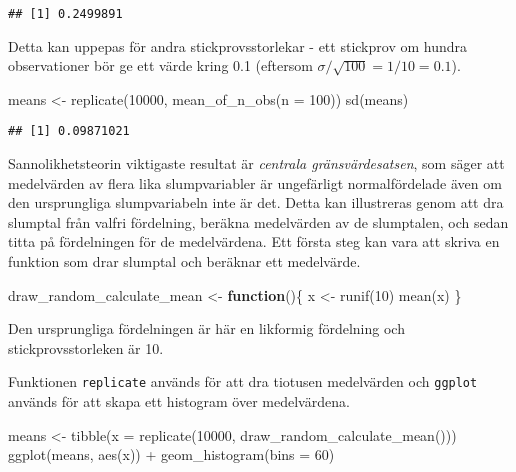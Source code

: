 \documentclass[
]{book}
\newenvironment{Shaded}{\begin{snugshade}}{\end{snugshade}}
\newcommand{\AttributeTok}[1]{\textcolor[rgb]{0.77,0.63,0.00}{#1}}
\newcommand{\ControlFlowTok}[1]{\textcolor[rgb]{0.13,0.29,0.53}{\textbf{#1}}}
\newcommand{\DecValTok}[1]{\textcolor[rgb]{0.00,0.00,0.81}{#1}}
\newcommand{\FunctionTok}[1]{\textcolor[rgb]{0.00,0.00,0.00}{#1}}
\newcommand{\NormalTok}[1]{#1}
\newcommand{\OtherTok}[1]{\textcolor[rgb]{0.56,0.35,0.01}{#1}}
\newcommand{\SpecialCharTok}[1]{\textcolor[rgb]{0.00,0.00,0.00}{#1}}
\theoremstyle{definition}
\theoremstyle{definition}
\theoremstyle{definition}
\theoremstyle{definition}
\theoremstyle{remark}
\begin{document}
\begin{verbatim}
## [1] 0.2499891
\end{verbatim}

Detta kan uppepas för andra stickprovsstorlekar - ett stickprov om hundra observationer bör ge ett värde kring 0.1 (eftersom \(\sigma / \sqrt{100} = 1 / 10 = 0.1\)).

\begin{Shaded}
\begin{Highlighting}[]
\NormalTok{means }\OtherTok{\textless{}{-}} \FunctionTok{replicate}\NormalTok{(}\DecValTok{10000}\NormalTok{, }\FunctionTok{mean\_of\_n\_obs}\NormalTok{(}\AttributeTok{n =} \DecValTok{100}\NormalTok{))}
\FunctionTok{sd}\NormalTok{(means)}
\end{Highlighting}
\end{Shaded}

\begin{verbatim}
## [1] 0.09871021
\end{verbatim}

Sannolikhetsteorin viktigaste resultat är \emph{centrala gränsvärdesatsen}, som säger att medelvärden av flera lika slumpvariabler är ungefärligt normalfördelade även om den ursprungliga slumpvariabeln inte är det. Detta kan illustreras genom att dra slumptal från valfri fördelning, beräkna medelvärden av de slumptalen, och sedan titta på fördelningen för de medelvärdena. Ett första steg kan vara att skriva en funktion som drar slumptal och beräknar ett medelvärde.

\begin{Shaded}
\begin{Highlighting}[]
\NormalTok{draw\_random\_calculate\_mean }\OtherTok{\textless{}{-}} \ControlFlowTok{function}\NormalTok{()\{}
\NormalTok{  x }\OtherTok{\textless{}{-}} \FunctionTok{runif}\NormalTok{(}\DecValTok{10}\NormalTok{)}
  \FunctionTok{mean}\NormalTok{(x)}
\NormalTok{\}}
\end{Highlighting}
\end{Shaded}

Den ursprungliga fördelningen är här en likformig fördelning och stickprovsstorleken är 10.

Funktionen \texttt{replicate} används för att dra tiotusen medelvärden och \texttt{ggplot} används för att skapa ett histogram över medelvärdena.

\begin{Shaded}
\begin{Highlighting}[]
\NormalTok{means }\OtherTok{\textless{}{-}} \FunctionTok{tibble}\NormalTok{(}\AttributeTok{x =} \FunctionTok{replicate}\NormalTok{(}\DecValTok{10000}\NormalTok{, }\FunctionTok{draw\_random\_calculate\_mean}\NormalTok{()))}
\FunctionTok{ggplot}\NormalTok{(means, }\FunctionTok{aes}\NormalTok{(x)) }\SpecialCharTok{+}
  \FunctionTok{geom\_histogram}\NormalTok{(}\AttributeTok{bins =} \DecValTok{60}\NormalTok{)}
\end{Highlighting}
\end{Shaded}
\end{document}
